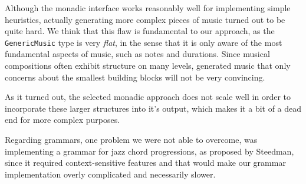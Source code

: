 \documentclass[11pt,a4paper]{article}
\newcommand{\icode}[1]{\texttt{#1}}
\begin{document}
Although the monadic interface works reasonably well for implementing simple heuristics, actually generating more complex pieces of music turned out to be quite hard. We think that this flaw is fundamental to our approach, as the \icode{GenericMusic} type is very \emph{flat}, in the sense that it is only aware of the most fundamental aspects of music, such as notes and durations. Since musical compositions often exhibit structure on many levels, generated music that only concerns about the smallest building blocks will not be very convincing.

As it turned out, the selected monadic approach does not scale well in order to incorporate these larger structures into it's output, which makes it a bit of a dead end for more complex purposes.

Regarding grammars, one problem we were not able to overcome, was implementing a grammar for jazz chord progressions, as proposed by Steedman\cite{jazzchords}, since it required context-sensitive features and that would make our grammar implementation overly complicated and necessarily slower.\\

\newpage


\end{document}
